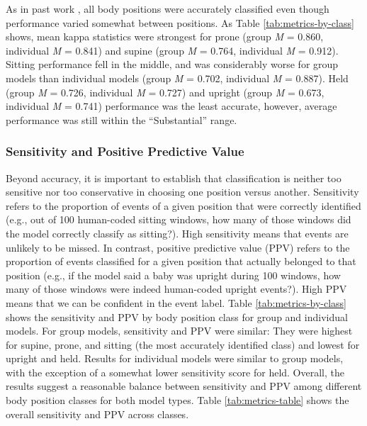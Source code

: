 \documentclass[
  man]{apa6}
\begin{document}
As in past work \autocite{FranchakScott2021,AiraksinenRasanen2020}, all body positions were accurately classified even though performance varied somewhat between positions. As Table \ref{tab:metrics-by-class} shows, mean kappa statistics were strongest for prone (group \emph{M} = 0.860, individual \emph{M} = 0.841) and supine (group \emph{M} = 0.764, individual \emph{M} = 0.912). Sitting performance fell in the middle, and was considerably worse for group models than individual models (group \emph{M} = 0.702, individual \emph{M} = 0.887). Held (group \emph{M} = 0.726, individual \emph{M} = 0.727) and upright (group \emph{M} = 0.673, individual \emph{M} = 0.741) performance was the least accurate, however, average performance was still within the ``Substantial'' range.

\hypertarget{sensitivity-and-positive-predictive-value}{%
\subsubsection{Sensitivity and Positive Predictive Value}\label{sensitivity-and-positive-predictive-value}}

Beyond accuracy, it is important to establish that classification is neither too sensitive nor too conservative in choosing one position versus another. Sensitivity refers to the proportion of events of a given position that were correctly identified (e.g., out of 100 human-coded sitting windows, how many of those windows did the model correctly classify as sitting?). High sensitivity means that events are unlikely to be missed. In contrast, positive predictive value (PPV) refers to the proportion of events classified for a given position that actually belonged to that position (e.g., if the model said a baby was upright during 100 windows, how many of those windows were indeed human-coded upright events?). High PPV means that we can be confident in the event label. Table \ref{tab:metrics-by-class} shows the sensitivity and PPV by body position class for group and individual models. For group models, sensitivity and PPV were similar: They were highest for supine, prone, and sitting (the most accurately identified class) and lowest for upright and held. Results for individual models were similar to group models, with the exception of a somewhat lower sensitivity score for held. Overall, the results suggest a reasonable balance between sensitivity and PPV among different body position classes for both model types. Table \ref{tab:metrics-table} shows the overall sensitivity and PPV across classes.
\end{document}

